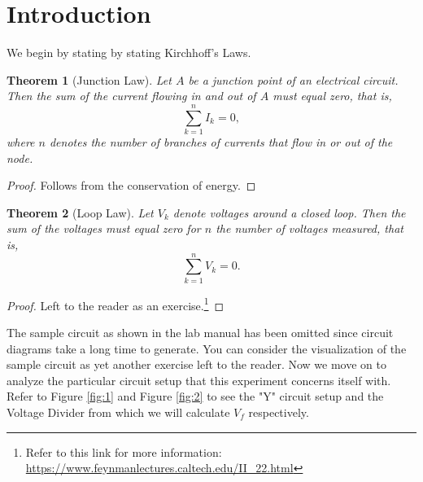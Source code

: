 \documentclass{article}
\newtheorem{theorem}{Theorem}
\begin{document}
\section{Introduction}
We begin by stating by stating Kirchhoff's Laws.
\begin{theorem}[Junction Law]\label{junction}
Let $A$ be a junction point of an electrical circuit. Then the sum of the current flowing in and out of $A$
must equal zero, that is,
\begin{equation*}
    \sum_{k=1}^n I_{k} = 0,
\end{equation*}
where $n$ denotes the number of branches of currents that flow in or out of the node.
\end{theorem}
\begin{proof}
    Follows from the conservation of energy.
\end{proof}
\begin{theorem}[Loop Law]\label{loop}
    Let $V_k$ denote voltages around a closed loop. Then the sum of the voltages must equal zero for $n$ the number of voltages measured, that is,
\begin{equation*}
    \sum_{k=1}^n V_{k} = 0.
\end{equation*}
\end{theorem}
\begin{proof}
    Left to the reader as an exercise.\footnote{Refer to this link for more information: \url{https://www.feynmanlectures.caltech.edu/II_22.html}}
\end{proof}
The sample circuit as shown in the lab manual has been omitted since circuit diagrams take a long time to generate. You can consider the visualization of the
sample circuit as yet another exercise left to the reader. Now we move on to analyze the particular circuit setup that this experiment concerns itself with. 
Refer to Figure \ref{fig:1} and Figure \ref{fig:2} to see the "Y" circuit setup and the Voltage Divider from which we will calculate $V_f$ respectively.
\end{document}
